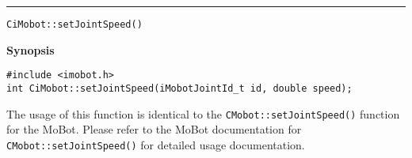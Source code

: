 \noindent
\vspace{5pt}
\rule{6.5in}{0.015in}
\noindent
{\LARGE \texttt{CiMobot::setJointSpeed()}}\\
{}

\noindent
{\bf Synopsis}\\
\begin{verbatim}
#include <imobot.h>
int CiMobot::setJointSpeed(iMobotJointId_t id, double speed);
\end{verbatim}

The usage of this function is identical to the
\texttt{CMobot::setJointSpeed()} function for the MoBot.
Please refer to the MoBot documentation for \texttt{CMobot::setJointSpeed()} for
detailed usage documentation.

